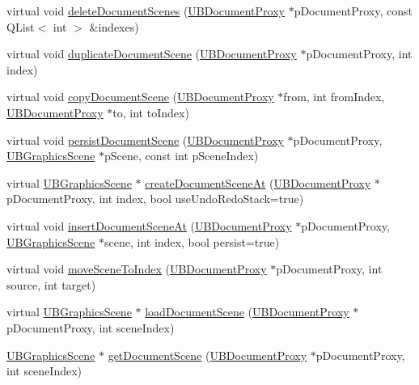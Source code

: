\begin{DoxyCompactItemize}
\item 
virtual void \hyperlink{class_u_b_persistence_manager_a8024bebd59a18f8cefa5f042aa42ed25}{delete\-Document\-Scenes} (\hyperlink{class_u_b_document_proxy}{U\-B\-Document\-Proxy} $\ast$p\-Document\-Proxy, const Q\-List$<$ int $>$ \&indexes)
\item 
virtual void \hyperlink{class_u_b_persistence_manager_aba40a98502fd7478221462306c2eb234}{duplicate\-Document\-Scene} (\hyperlink{class_u_b_document_proxy}{U\-B\-Document\-Proxy} $\ast$p\-Document\-Proxy, int index)
\item 
virtual void \hyperlink{class_u_b_persistence_manager_a02050499f8179287038922f42ddf2e17}{copy\-Document\-Scene} (\hyperlink{class_u_b_document_proxy}{U\-B\-Document\-Proxy} $\ast$from, int from\-Index, \hyperlink{class_u_b_document_proxy}{U\-B\-Document\-Proxy} $\ast$to, int to\-Index)
\item 
virtual void \hyperlink{class_u_b_persistence_manager_abc6ab5e964275e015e5da1450c2b8675}{persist\-Document\-Scene} (\hyperlink{class_u_b_document_proxy}{U\-B\-Document\-Proxy} $\ast$p\-Document\-Proxy, \hyperlink{class_u_b_graphics_scene}{U\-B\-Graphics\-Scene} $\ast$p\-Scene, const int p\-Scene\-Index)
\item 
virtual \hyperlink{class_u_b_graphics_scene}{U\-B\-Graphics\-Scene} $\ast$ \hyperlink{class_u_b_persistence_manager_a76cf6f2838a93d64153d7eb6e62521ff}{create\-Document\-Scene\-At} (\hyperlink{class_u_b_document_proxy}{U\-B\-Document\-Proxy} $\ast$p\-Document\-Proxy, int index, bool use\-Undo\-Redo\-Stack=true)
\item 
virtual void \hyperlink{class_u_b_persistence_manager_ad2e4eae2155a0ce644d556b658f3229a}{insert\-Document\-Scene\-At} (\hyperlink{class_u_b_document_proxy}{U\-B\-Document\-Proxy} $\ast$p\-Document\-Proxy, \hyperlink{class_u_b_graphics_scene}{U\-B\-Graphics\-Scene} $\ast$scene, int index, bool persist=true)
\item 
virtual void \hyperlink{class_u_b_persistence_manager_ab25757455d7f0dc3a356977e4156acda}{move\-Scene\-To\-Index} (\hyperlink{class_u_b_document_proxy}{U\-B\-Document\-Proxy} $\ast$p\-Document\-Proxy, int source, int target)
\item 
virtual \hyperlink{class_u_b_graphics_scene}{U\-B\-Graphics\-Scene} $\ast$ \hyperlink{class_u_b_persistence_manager_aff136b4bcedbd0af3ee2a6ede8af6f66}{load\-Document\-Scene} (\hyperlink{class_u_b_document_proxy}{U\-B\-Document\-Proxy} $\ast$p\-Document\-Proxy, int scene\-Index)
\item 
\hyperlink{class_u_b_graphics_scene}{U\-B\-Graphics\-Scene} $\ast$ \hyperlink{class_u_b_persistence_manager_a6812070bd7380792fe0ffe0d16a92009}{get\-Document\-Scene} (\hyperlink{class_u_b_document_proxy}{U\-B\-Document\-Proxy} $\ast$p\-Document\-Proxy, int scene\-Index)

\end{DoxyCompactItemize}
